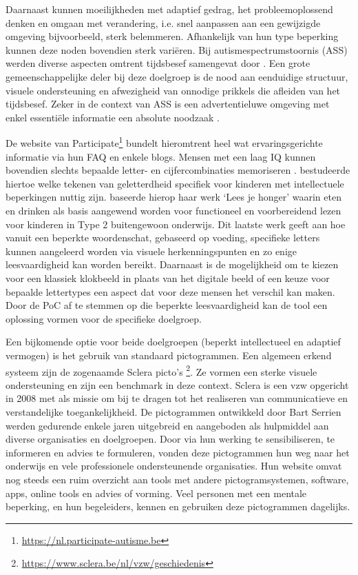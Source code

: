 Daarnaast kunnen moeilijkheden met adaptief gedrag, het probleemoplossend denken en omgaan met verandering, i.e. snel aanpassen aan een gewijzigde omgeving bijvoorbeeld, sterk belemmeren. Afhankelijk van hun type beperking kunnen deze noden bovendien sterk variëren. Bij autismespectrumstoornis (ASS) werden diverse aspecten omtrent tijdsbesef samengevat door \textcite{Degrieck2014}. Een grote gemeenschappelijke deler bij deze doelgroep is de nood aan eenduidige structuur, visuele ondersteuning en afwezigheid van onnodige prikkels die afleiden van het tijdsbesef. Zeker in de context van ASS is een advertentieluwe omgeving met enkel essentiële informatie een absolute noodzaak \autocite{Roeyers2014}. 

De website van Participate\footnote{\url{https://nl.participate-autisme.be}} bundelt hieromtrent heel wat ervaringsgerichte informatie via hun FAQ en enkele blogs. Mensen met een laag IQ kunnen bovendien slechts bepaalde letter- en cijfercombinaties memoriseren \autocite{DeGraaf2001, Tytgat2014}. \textcite{Tilborg2018} bestudeerde hiertoe welke tekenen van geletterdheid specifiek voor kinderen met intellectuele beperkingen nuttig zijn. \textcite{Uyttersprot2021} baseerde hierop haar werk `Lees je honger' waarin eten en drinken als basis aangewend worden voor functioneel en voorbereidend lezen voor kinderen in Type 2 buitengewoon onderwijs. Dit laatste werk geeft aan hoe vanuit een beperkte woordenschat, gebaseerd op voeding, specifieke letters kunnen aangeleerd worden via visuele herkenningspunten en zo enige leesvaardigheid kan worden bereikt. Daarnaast is de mogelijkheid om te kiezen voor een klassiek klokbeeld in plaats van het digitale beeld of een keuze voor bepaalde lettertypes een aspect dat voor deze mensen het verschil kan maken. Door de PoC af te stemmen op die beperkte leesvaardigheid kan de tool een oplossing vormen voor de specifieke doelgroep. 

Een bijkomende optie voor beide doelgroepen (beperkt intellectueel en adaptief vermogen) is het gebruik van standaard pictogrammen. Een algemeen erkend systeem zijn de zogenaamde Sclera picto's \footnote{\url{https://www.sclera.be/nl/vzw/geschiedenis}}. Ze vormen een sterke visuele ondersteuning en zijn een benchmark in deze context. Sclera is een vzw opgericht in 2008 met als missie om bij te dragen tot het realiseren van communicatieve en verstandelijke toegankelijkheid. De pictogrammen ontwikkeld door Bart Serrien werden gedurende enkele jaren uitgebreid en aangeboden als hulpmiddel aan diverse organisaties en doelgroepen. Door via hun werking te sensibiliseren, te informeren en advies te formuleren, vonden deze pictogrammen hun weg naar het onderwijs en vele professionele ondersteunende organisaties. Hun website omvat nog steeds een ruim overzicht aan tools met andere pictogramsystemen, software, apps, online tools en advies of vorming. Veel personen met een mentale beperking, en hun begeleiders, kennen en gebruiken deze pictogrammen dagelijks. 

